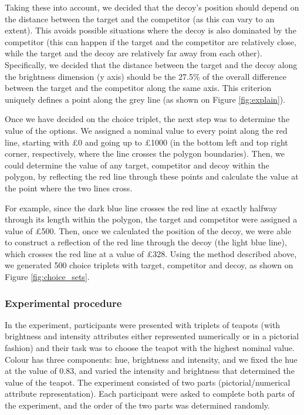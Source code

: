 \documentclass[11pt,a4paper]{article}
\begin{document}
Taking these into account, we decided that the decoy's position should depend on the distance between the target and the competitor (as this can vary to an extent). This avoids possible situations where the decoy is also dominated by the competitor (this can happen if the target and the competitor are relatively close, while the target and the decoy are relatively far away from each other). Specifically, we decided that the distance between the target and the decoy along the brightness dimension (y axis) should be the 27.5\% of the overall difference between the target and the competitor along the same axis. This criterion uniquely defines a point along the grey line (as shown on Figure \ref{fig:explain}).

Once we have decided on the choice triplet, the next step was to determine the value of the options. We assigned a nominal value to every point along the red line, starting with £0 and going up to £1000 (in the bottom left and top right corner, respectively, where the line crosses the polygon boundaries). Then, we could determine the value of any target, competitor and decoy within the polygon, by reflecting the red line through these points and calculate the value at the point where the two lines cross. 

For example, since the dark blue line crosses the red line at exactly halfway through its length within the polygon, the target and competitor were assigned a value of £500. Then, once we calculated the position of the decoy, we were able to construct a reflection of the red line through the decoy (the light blue line), which crosses the red line at a value of £328. Using the method described above, we generated 500 choice triplets with target, competitor and decoy, as shown on Figure \ref{fig:choice_sets}. 

\subsubsection{Experimental procedure}

In the experiment, participants were presented with triplets of teapots (with brightness and intensity attributes either represented numerically or in a pictorial fashion) and their task was to choose the teapot with the highest nominal value. Colour has three components: hue, brightness and intensity, and we fixed the hue at the value of 0.83, and varied the 
intensity and brightness that determined the value of the teapot. The experiment consisted of two parts (pictorial/numerical attribute representation). Each participant were asked to complete both parts of the experiment, and the order of the two parts was determined randomly. 
\end{document}
